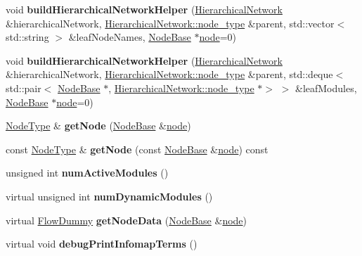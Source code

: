 \begin{DoxyCompactItemize}
\item 
\mbox{\label{classInfomapGreedy_a661c0fcd1f35daf78c882b636d6c562b}} 
void {\bfseries build\+Hierarchical\+Network\+Helper} (\mbox{\hyperlink{classHierarchicalNetwork}{Hierarchical\+Network}} \&hierarchical\+Network, \mbox{\hyperlink{classSNode}{Hierarchical\+Network\+::node\+\_\+type}} \&parent, std\+::vector$<$ std\+::string $>$ \&leaf\+Node\+Names, \mbox{\hyperlink{classNodeBase}{Node\+Base}} $\ast$\mbox{\hyperlink{structnode}{node}}=0)
\item 
\mbox{\label{classInfomapGreedy_a3a5a5ca2ea604828316528997cec3f4f}} 
void {\bfseries build\+Hierarchical\+Network\+Helper} (\mbox{\hyperlink{classHierarchicalNetwork}{Hierarchical\+Network}} \&hierarchical\+Network, \mbox{\hyperlink{classSNode}{Hierarchical\+Network\+::node\+\_\+type}} \&parent, std\+::deque$<$ std\+::pair$<$ \mbox{\hyperlink{classNodeBase}{Node\+Base}} $\ast$, \mbox{\hyperlink{classSNode}{Hierarchical\+Network\+::node\+\_\+type}} $\ast$$>$ $>$ \&leaf\+Modules, \mbox{\hyperlink{classNodeBase}{Node\+Base}} $\ast$\mbox{\hyperlink{structnode}{node}}=0)
\item 
\mbox{\label{classInfomapGreedy_a11a1d5d91080168d356af81cc94cde35}} 
\mbox{\hyperlink{classNode}{Node\+Type}} \& {\bfseries get\+Node} (\mbox{\hyperlink{classNodeBase}{Node\+Base}} \&\mbox{\hyperlink{structnode}{node}})
\item 
\mbox{\label{classInfomapGreedy_a18b88ba06696752b0a0f2d3fd88bcf34}} 
const \mbox{\hyperlink{classNode}{Node\+Type}} \& {\bfseries get\+Node} (const \mbox{\hyperlink{classNodeBase}{Node\+Base}} \&\mbox{\hyperlink{structnode}{node}}) const
\item 
\mbox{\label{classInfomapGreedy_aaa5cb942809843ac68555b8968550ce5}} 
unsigned int {\bfseries num\+Active\+Modules} ()
\item 
\mbox{\label{classInfomapGreedy_ae6e095686aba6d35b9c9d0b46d4331f9}} 
virtual unsigned int {\bfseries num\+Dynamic\+Modules} ()
\item 
\mbox{\label{classInfomapGreedy_a8e437f8a037687eec90c2e5019765049}} 
virtual \mbox{\hyperlink{structFlowDummy}{Flow\+Dummy}} {\bfseries get\+Node\+Data} (\mbox{\hyperlink{classNodeBase}{Node\+Base}} \&\mbox{\hyperlink{structnode}{node}})
\item 
\mbox{\label{classInfomapGreedy_a2643c17305063ecdce23a6e21893fa98}} 
virtual void {\bfseries debug\+Print\+Infomap\+Terms} ()
\end{DoxyCompactItemize}
